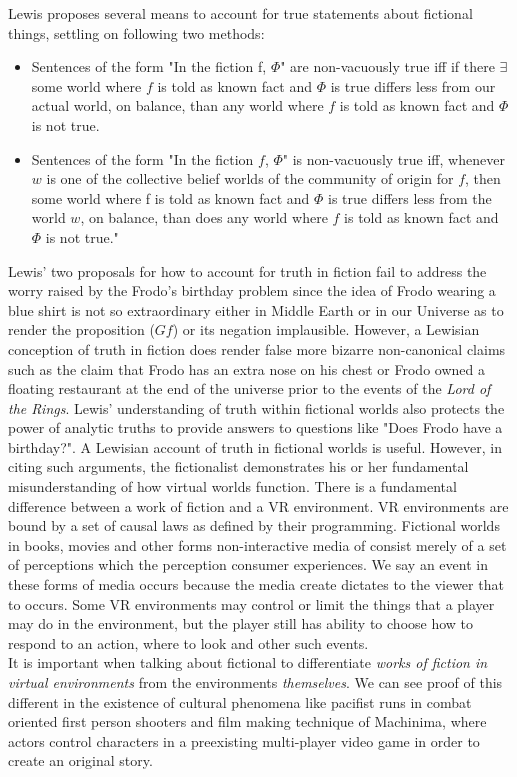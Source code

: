  Lewis proposes several means to account for true statements about fictional things, settling on following two methods: 
 \begin{itemize}
 	\item Sentences of the form "In the fiction f, $\Phi$" are non-vacuously true iff if there $\exists$ some
 	world where $f$ is told as known fact and $\Phi$ is true differs less from our actual world, on
 	balance, than any world where $f$ is told as known fact and $\Phi$ is not true. \cite{Lewis1978-LEWTIF}
 	\item Sentences of the form "In the fiction $f$, $\Phi$" is non-vacuously true iff,
 	whenever $w$ is one of the collective belief worlds of the community of origin for $f$, then
 	some world where f is told as known fact and $\Phi$ is true differs less from the world $w$, on
 	balance, than does any world where $f$ is told as known fact and $\Phi$ is not true." \cite{Lewis1978-LEWTIF} \newline
 \end{itemize}
 
 Lewis' two proposals for how to account for truth in fiction fail to address the worry raised by the Frodo's birthday problem since the idea of Frodo wearing a blue shirt is not so extraordinary either in Middle Earth or in our Universe as to render the proposition ($Gf$) or its negation implausible. However, a Lewisian conception of truth in fiction does render false more bizarre non-canonical claims such as the claim that Frodo has an extra nose on his chest or Frodo owned a floating restaurant at the end of the universe prior to the events of the \textit{Lord of the Rings}. Lewis' understanding of truth within fictional worlds also protects the power of analytic truths to provide answers to questions like "Does Frodo have a birthday?". \newline
 A Lewisian account of truth in fictional worlds is useful. However, in citing such arguments, the fictionalist demonstrates his or her fundamental misunderstanding of how virtual worlds function. There is a fundamental difference between a work of fiction and a VR environment. VR environments are bound by a set of causal laws as defined by their programming. Fictional worlds in books, movies and other forms non-interactive media of consist merely of a set of perceptions which the perception consumer experiences. We say an event in these forms of media occurs because the media create dictates to the viewer that to occurs. Some VR environments may control or limit the things that a player may do in the environment, but the player still has ability to choose how to respond to an action, where to look and other such events. \\ It is important when talking about fictional to differentiate \textit{works of fiction in virtual environments} from the environments  \textit{themselves}. We can see proof of this different in the existence of cultural phenomena like pacifist runs in combat oriented first person shooters and film making technique of Machinima, where actors control characters in a preexisting multi-player video game in order to create an original story.  
 

